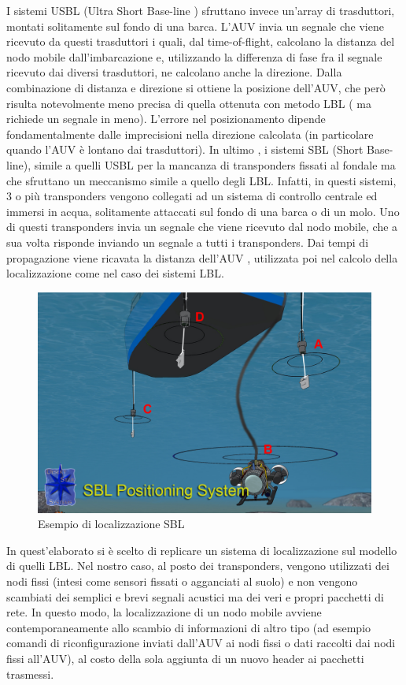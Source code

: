 \documentclass[Lau,binding=0.6cm]{sapthesis}
\begin{document}
I sistemi USBL (Ultra Short Base-line ) sfruttano invece un'array di trasduttori, montati solitamente sul fondo di una barca. L'AUV invia un segnale che viene ricevuto da questi trasduttori i quali, dal time-of-flight, calcolano la distanza del nodo mobile dall'imbarcazione e, utilizzando la differenza di fase fra il segnale ricevuto dai diversi trasduttori, ne calcolano anche la direzione. Dalla combinazione di distanza e direzione si ottiene la posizione dell'AUV, che però risulta notevolmente meno precisa di quella ottenuta con metodo LBL ( ma richiede un segnale in meno). L'errore nel posizionamento dipende fondamentalmente dalle imprecisioni nella direzione calcolata (in particolare quando l'AUV è lontano dai trasduttori).\newline
In ultimo , i sistemi SBL (Short Base-line), simile a quelli USBL per la mancanza di transponders fissati al fondale ma che sfruttano un meccanismo simile a quello degli LBL. Infatti, in questi sistemi, 3 o più transponders vengono collegati ad un sistema di controllo centrale ed immersi in acqua, solitamente attaccati sul fondo di una barca o di un molo. Uno di questi transponders invia un segnale che viene ricevuto dal nodo mobile, che a sua volta risponde inviando un segnale a tutti i transponders. Dai tempi di propagazione viene ricavata la distanza dell'AUV , utilizzata poi nel calcolo della localizzazione come nel caso dei sistemi LBL.

\begin{figure}[H]
	\centering
	\includegraphics[scale=0.25]{SBL.jpg}
	\caption{ Esempio di localizzazione SBL}
	\label{fig:SBL}
\end{figure}


\par
In quest'elaborato si è scelto di replicare un sistema di localizzazione sul modello di quelli LBL. Nel nostro caso, al posto dei transponders, vengono utilizzati dei nodi fissi (intesi come sensori fissati o agganciati al suolo) e non vengono scambiati dei semplici e brevi segnali acustici ma dei veri e propri pacchetti di rete. In questo modo, la localizzazione di un nodo mobile avviene contemporaneamente allo scambio di informazioni di altro tipo (ad esempio comandi di riconfigurazione inviati dall'AUV ai nodi fissi o dati raccolti dai nodi fissi all'AUV), al costo della sola aggiunta di un nuovo header ai pacchetti trasmessi.  
\end{document}
